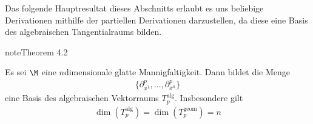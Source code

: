 \documentclass[letterpaper,10pt,english]{jupyterBook}
\begin{document}
\sphinxAtStartPar
Das folgende Hauptresultat dieses Abschnitts erlaubt es uns beliebige Derivationen mithilfe der partiellen Derivationen darzustellen, da diese eine Basis des algebraischen Tangentialraums bilden.
\label{manifolds/tangential:thm:tanbasis}
\begin{sphinxadmonition}{note}{Theorem 4.2}



\sphinxAtStartPar
Es sei \(\M\) eine \(n\)\sphinxhyphen{}dimensionale glatte Mannigfaltigkeit.
Dann bildet die Menge
\begin{equation*}
\begin{split}\{\partial_{x^1}^p,\ldots,\partial_{x^n}^p\}\end{split}
\end{equation*}
\sphinxAtStartPar
eine Basis des algebraischen Vektorraums \(T^{\text{alg}}_p\).
Insbesondere gilt
\begin{equation*}
\begin{split}\dim(T^{\text{alg}}_p)=\dim(T^{\text{geom}}_p)=n\end{split}
\end{equation*}\end{sphinxadmonition}
\end{document}
